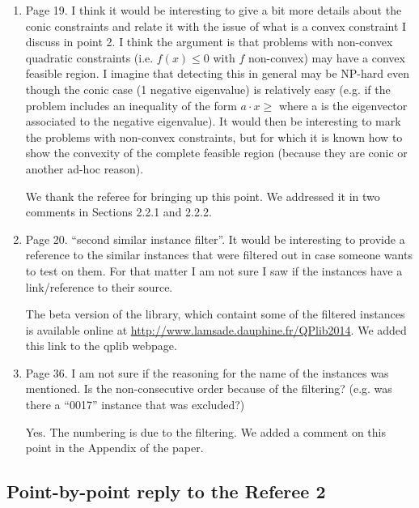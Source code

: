 \documentclass[11pt]{article}
\newcommand{\rep}[1]{{\textcolor{acblue}{#1}}}
\newcommand{\leo}[1]{{\color{red}#1}}
\newcommand{\fabio}[1]{{\color{cyan}#1}}
\begin{document}
{\begin{enumerate}
\item Page 19. I think it would be interesting to give a bit more details about the conic constraints and relate it with the issue of what is a convex
constraint I discuss in point 2. I think the argument is that problems with
non-convex quadratic constraints (i.e. $f (x) \le 0$ with $f$ non-convex) may
have a convex feasible region. I imagine that detecting this in general may
be NP-hard even though the conic case (1 negative eigenvalue) is relatively
easy (e.g. if the problem includes an inequality of the form $a \cdot x \ge$ where
a is the eigenvector associated to the negative eigenvalue). It would then
be interesting to mark the problems with non-convex constraints, but for
which it is known how to show the convexity of the complete feasible
region (because they are conic or another ad-hoc reason).

\rep{We thank the referee for bringing up this point. We addressed it in two comments in Sections 2.2.1 and 2.2.2. 
 }


\item Page 20. ``second similar instance filter''. It would be interesting to provide a reference to the similar instances that were filtered out in case
someone wants to test on them. For that matter I am not sure I saw if
the instances have a link/reference to their source.


\rep{The beta version of the library, which containt some of the filtered instances is available online at  \url{http://www.lamsade.dauphine.fr/QPlib2014}. We added this link to the qplib webpage.}



\item Page 36. I am not sure if the reasoning for the name of the instances was mentioned. Is the non-consecutive order because of the filtering? (e.g.
was there a ``0017'' instance that was excluded?)

\rep{Yes. The numbering is due to the filtering. We added a comment on this point in the Appendix of the paper.}


\end{enumerate}
}



\subsection*{Point-by-point reply to the Referee 2}
\end{document}
